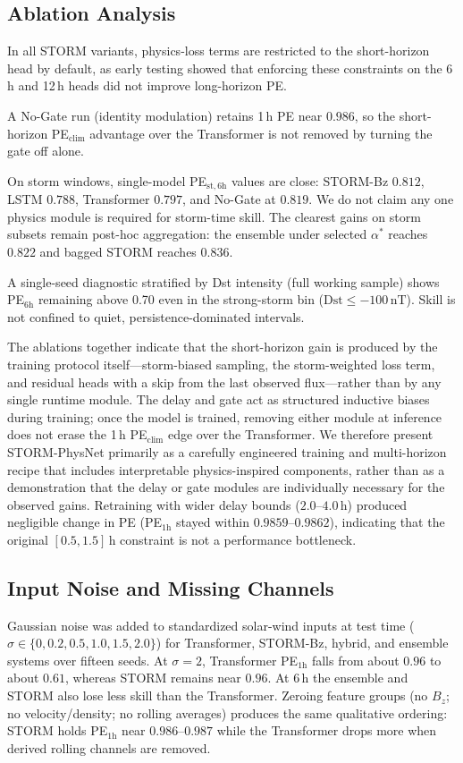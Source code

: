 \documentclass[conference]{IEEEtran}
\begin{document}
\subsection{Ablation Analysis}
In all STORM variants, physics-loss terms are restricted to the
short-horizon head by default, as early testing showed that enforcing
these constraints on the 6\,h and 12\,h heads did not improve long-horizon PE.

A No-Gate run (identity modulation) retains 1\,h PE near \(0.986\), so the short-horizon PE\(_{\mathrm{clim}}\) advantage over
the Transformer is not removed by turning the gate off alone.

On storm windows, single-model PE\(_{\mathrm{st},6\mathrm{h}}\) values
are close: STORM-Bz \(0.812\), LSTM \(0.788\), Transformer \(0.797\),
and No-Gate at \(0.819\). We do not claim any one physics
module is required for storm-time skill. The clearest gains on storm
subsets remain post-hoc aggregation: the ensemble under selected \(\alpha^*\)
reaches \(0.822\) and bagged STORM reaches \(0.836\).

A single-seed diagnostic stratified by Dst intensity (full working
sample) shows PE\(_{6\mathrm{h}}\) remaining above 0.70 even in the
strong-storm bin (\(\mathrm{Dst}\le-100\,\mathrm{nT}\)). Skill is not
confined to quiet, persistence-dominated intervals.

The ablations together indicate that the short-horizon gain is produced by the training protocol itself---storm-biased sampling, the storm-weighted loss term, and residual heads with a skip from the last observed flux---rather than by any single runtime module. The delay and gate act as structured inductive biases during training; once the model is trained, removing either module at inference does not erase the 1\,h PE\(_{\mathrm{clim}}\) edge over the Transformer. We therefore present STORM-PhysNet primarily as a carefully engineered training and multi-horizon recipe that includes interpretable physics-inspired components, rather than as a demonstration that the delay or gate modules are individually necessary for the observed gains. Retraining with wider delay bounds ($2.0$--$4.0$\,h) produced negligible change in PE (PE$_{1\mathrm{h}}$ stayed within $0.9859$--$0.9862$), indicating that the original $[0.5, 1.5]$\,h constraint is not a performance bottleneck.

\subsection{Input Noise and Missing Channels}
Gaussian noise was added to standardized solar-wind inputs at test time
(\(\sigma\in\{0,0.2,0.5,1.0,1.5,2.0\}\)) for Transformer, STORM-Bz,
hybrid, and ensemble systems over fifteen seeds.
At \(\sigma=2\), Transformer PE\(_{1\mathrm{h}}\) falls from about
\(0.96\) to about \(0.61\), whereas STORM remains near \(0.96\).
At 6\,h the ensemble and STORM also lose less skill than the Transformer.
Zeroing feature groups (no \(B_z\); no velocity/density; no rolling
averages) produces the same qualitative ordering: STORM holds
PE\(_{1\mathrm{h}}\) near \(0.986\mbox{--}0.987\) while the Transformer drops more
when derived rolling channels are removed.
\end{document}
